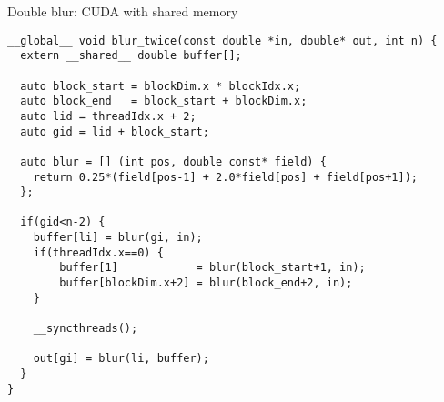 \documentclass[aspectratio=43]{beamer}
\begin{document}
\begin{frame}[fragile]{}
    \begin{code}{Double blur: CUDA with shared memory}
        \begin{lstlisting}[style=boxcudatiny]
__global__ void blur_twice(const double *in, double* out, int n) {
  extern __shared__ double buffer[];

  auto block_start = blockDim.x * blockIdx.x;
  auto block_end   = block_start + blockDim.x;
  auto lid = threadIdx.x + 2;
  auto gid = lid + block_start;

  auto blur = [] (int pos, double const* field) {
    return 0.25*(field[pos-1] + 2.0*field[pos] + field[pos+1]);
  };

  if(gid<n-2) {
    buffer[li] = blur(gi, in);
    if(threadIdx.x==0) {
        buffer[1]            = blur(block_start+1, in);
        buffer[blockDim.x+2] = blur(block_end+2, in);
    }

    __syncthreads();

    out[gi] = blur(li, buffer);
  }
}
        \end{lstlisting}
    \end{code}
\end{frame}
\end{document}
